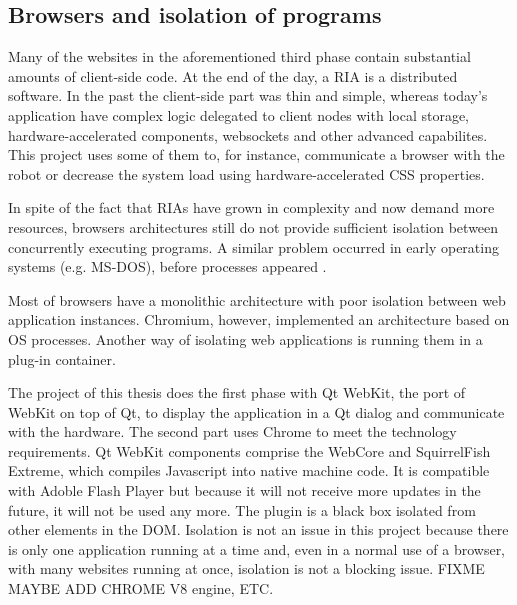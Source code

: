 \subsection{Browsers and isolation of programs}    
Many of the websites in the aforementioned third phase contain substantial amounts of client-side code. 
At the end of the day, a \ac{RIA} is a distributed software. 
In the past the client-side part was thin and simple, whereas today's application have complex logic delegated to client nodes with local storage, hardware-accelerated components, websockets and other advanced capabilites.
This project uses some of them to, for instance, communicate a browser with the robot or decrease the system load using hardware-accelerated \ac{CSS} properties.

In spite of the fact that \acp{RIA} have grown in complexity and now demand more resources, browsers architectures still do not provide sufficient isolation between concurrently executing programs.
A similar problem occurred in early operating systems (e.g. MS-DOS), before processes appeared \cite{Reis:2009}. 

Most of browsers have a monolithic architecture with poor isolation between web application instances. Chromium, however, implemented an architecture based on \ac{OS} processes. 
Another way of isolating web applications is running them in a plug-in container. 

The project of this thesis does the first phase with Qt WebKit, the port of WebKit on top of Qt, to display the application in a Qt dialog and communicate with the hardware. 
The second part uses Chrome to meet the technology requirements.
Qt WebKit components comprise the WebCore and SquirrelFish Extreme, which compiles Javascript into native machine code. 
It is compatible with Adoble Flash Player but because it will not receive more updates in the future, it will not be used any more.
The \flash plugin is a black box isolated from other elements in the \ac{DOM}.
Isolation is not an issue in this project because there is only one application running at a time and, even in a normal use of a browser, with many websites running at once, isolation is not a blocking issue.
FIXME MAYBE ADD CHROME V8 engine, ETC.


